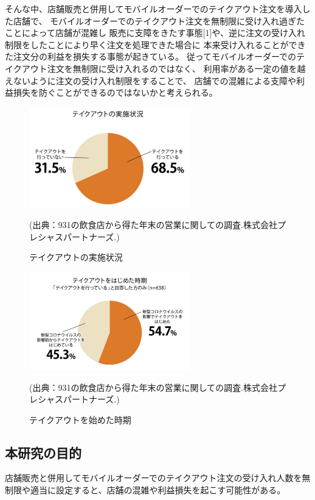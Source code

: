 \documentclass{jsarticle}
\begin{document}
そんな中、店舗販売と併用してモバイルオーダーでのテイクアウト注文を導入した店舗で、
モバイルオーダーでのテイクアウト注文を無制限に受け入れ過ぎたことによって店舗が混雑し
販売に支障をきたす事態[1]や、逆に注文の受け入れ制限をしたことにより早く注文を処理できた場合に
本来受け入れることができた注文分の利益を損失する事態が起きている。
従ってモバイルオーダーでのテイクアウト注文を無制限に受け入れるのではなく、
利用率がある一定の値を越えないように注文の受け入れ制限をすることで、
店舗での混雑による支障や利益損失を防ぐことができるのではないかと考えられる。

\begin{figure}[H]
  \centering
  \includegraphics[width=7cm]{1.png}
  \caption{テイクアウトの実施状況}
  \scriptsize(出典：931の飲食店から得た年末の営業に関しての調査.株式会社プレシャスパートナーズ.)
  \label{fig:1}
\end{figure}

\begin{figure}[H]
  \centering
  \includegraphics[width=7cm]{2.png}
  \caption{テイクアウトを始めた時期}
  \scriptsize(出典：931の飲食店から得た年末の営業に関しての調査.株式会社プレシャスパートナーズ.)
  \label{fig:2}
\end{figure}




\newpage

\subsection{本研究の目的}
店舗販売と併用してモバイルオーダーでのテイクアウト注文の受け入れ人数を無制限や適当に設定すると、店舗の混雑や利益損失を起こす可能性がある。
\end{document}
